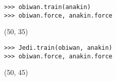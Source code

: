\begin{blocksection}
\begin{lstlisting}
>>> obiwan.train(anakin)
>>> obiwan.force, anakin.force
\end{lstlisting}
\begin{solution}[.2in]
(50, 35)
\end{solution}

\begin{lstlisting}
>>> Jedi.train(obiwan, anakin)
>>> obiwan.force, anakin.force
\end{lstlisting}
\begin{solution}[.2in]
(50, 45)
\end{solution}
\end{blocksection}
